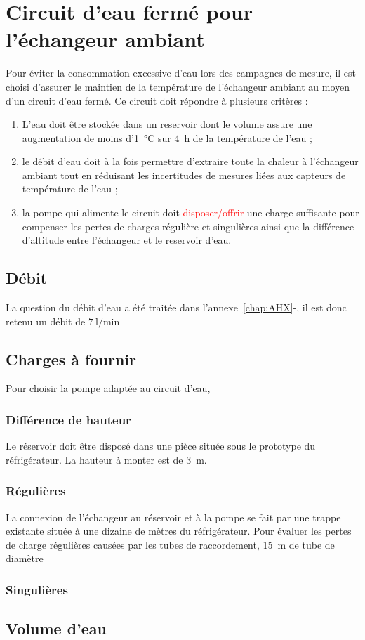 \chapter{Circuit d'eau fermé pour l'échangeur ambiant}

Pour éviter la consommation excessive d'eau lors des campagnes de mesure, il est choisi d'assurer le maintien de la température de l'échangeur ambiant au moyen d'un circuit d'eau fermé. Ce circuit doit répondre à plusieurs critères :

\begin{enumerate}
    \item L'eau doit être stockée dans un reservoir dont le volume assure une augmentation de moins d'\qty{1}{\degreeCelsius} sur \qty{4}{\hour} de la température de l'eau ;\label{list:CircFerme_Volume}%
    \item le débit d'eau doit à la fois permettre d'extraire toute la chaleur à l'échangeur ambiant tout en réduisant les incertitudes de mesures liées aux capteurs de température de l'eau ;\label{list:CircFerme_Debit}%
    \item la pompe qui alimente le circuit doit \textcolor{red}{disposer/offrir} une charge suffisante pour compenser les pertes de charges régulière et singulières ainsi que la différence d'altitude entre l'échangeur et le reservoir d'eau.\label{list:CircFerme_Charge}
\end{enumerate}

\section{Débit}
La question du débit d'eau a été traitée dans l'annexe~\ref{chap:AHX}-, il est donc retenu un débit de $\qty{7}{\litre\per\minute}$

\section{Charges à fournir}
Pour choisir la pompe adaptée au circuit d'eau, 

\subsection{Différence de hauteur}
Le réservoir doit être disposé dans une pièce située sous le prototype du réfrigérateur. La hauteur à monter est de \qty{3}{\meter}.

\subsection{Régulières}
La connexion de l'échangeur au réservoir et à la pompe se fait par une trappe existante située à une dizaine de mètres du réfrigérateur. Pour évaluer les pertes de charge régulières causées par les tubes de raccordement, \qty{15}{\metre} de tube de diamètre 

\subsection{Singulières}


\section{Volume d'eau}
